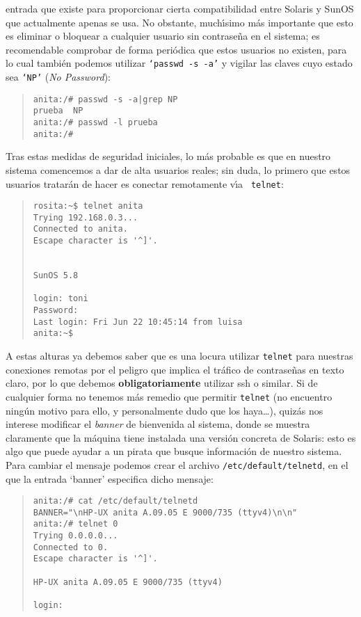 entrada que existe para proporcionar cierta compatibilidad entre Solaris y 
SunOS que actualmente apenas se usa. No obstante, much\'{\i}simo m\'as 
importante que esto es eliminar o bloquear a cualquier usuario sin contrase\~na
en el sistema; es recomendable comprobar de forma peri\'odica que estos usuarios
no existen, para lo cual tambi\'en podemos utilizar {\tt `passwd -s -a'} y
vigilar las claves cuyo estado sea {\tt `NP'} ({\it No Password}):
\begin{quote}
\begin{verbatim}
anita:/# passwd -s -a|grep NP
prueba  NP
anita:/# passwd -l prueba
anita:/# 
\end{verbatim}
\end{quote}
Tras estas medidas de seguridad iniciales, lo m\'as probable es que en 
nuestro sistema comencemos a dar de alta usuarios reales; sin duda, lo primero
que estos usuarios tratar\'an de hacer es conectar remotamente v\'{\i}a {\tt
telnet}:
\begin{quote}
\begin{verbatim}
rosita:~$ telnet anita
Trying 192.168.0.3...
Connected to anita.
Escape character is '^]'.


SunOS 5.8

login: toni
Password: 
Last login: Fri Jun 22 10:45:14 from luisa
anita:~$ 
\end{verbatim}
\end{quote}
A estas alturas ya debemos saber que es una locura utilizar {\tt telnet} para
nuestras conexiones remotas por el peligro que implica el tr\'afico de 
contrase\~nas en texto claro, por lo que debemos {\bf obligatoriamente} utilizar
{\sc ssh} o similar. Si de cualquier forma no tenemos m\'as remedio que 
permitir {\tt telnet} (no encuentro ning\'un motivo para ello, y personalmente 
dudo que los haya\ldots), quiz\'as nos interese modificar el {\it banner} de 
bienvenida al sistema, donde se muestra claramente que la m\'aquina tiene 
instalada una versi\'on concreta de Solaris: esto es algo que puede ayudar a un
pirata que busque informaci\'on de nuestro sistema. Para cambiar el mensaje
podemos crear el archivo {\tt /etc/default/telnetd}, en el que la entrada {\sc
`banner'} especifica dicho mensaje:
\begin{quote}
\begin{verbatim}
anita:/# cat /etc/default/telnetd 
BANNER="\nHP-UX anita A.09.05 E 9000/735 (ttyv4)\n\n" 
anita:/# telnet 0
Trying 0.0.0.0...
Connected to 0.
Escape character is '^]'.

HP-UX anita A.09.05 E 9000/735 (ttyv4)

login: 

\end{verbatim}
\end{quote}
